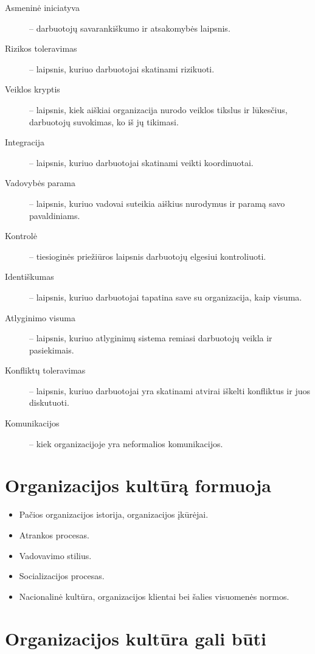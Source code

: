 \begin{description}
  \item[Asmeninė iniciatyva] – darbuotojų savarankiškumo ir atsakomybės
    laipsnis.
  \item[Rizikos toleravimas] – laipsnis, kuriuo darbuotojai skatinami
    rizikuoti.
  \item[Veiklos kryptis] – laipsnis, kiek aiškiai organizacija nurodo
    veiklos tikslus ir lūkesčius, darbuotojų suvokimas, ko iš jų tikimasi.
  \item[Integracija] – laipsnis, kuriuo darbuotojai skatinami veikti
    koordinuotai.
  \item[Vadovybės parama] – laipsnis, kuriuo vadovai suteikia aiškius
    nurodymus ir paramą savo pavaldiniams.
  \item[Kontrolė] – tiesioginės priežiūros laipsnis darbuotojų elgesiui
    kontroliuoti.
  \item[Identiškumas] – laipsnis, kuriuo darbuotojai tapatina save su
    organizacija, kaip visuma.
  \item[Atlyginimo visuma] – laipsnis, kuriuo atlyginimų sistema remiasi
    darbuotojų veikla ir pasiekimais.
  \item[Konfliktų toleravimas] – laipsnis, kuriuo darbuotojai yra skatinami
    atvirai iškelti konfliktus ir juos diskutuoti.
  \item[Komunikacijos] – kiek organizacijoje yra neformalios komunikacijos.
\end{description}

\section{Organizacijos kultūrą formuoja}

\begin{itemize}
  \item Pačios organizacijos istorija, organizacijos įkūrėjai.
  \item Atrankos procesas.
  \item Vadovavimo stilius.
  \item Socializacijos procesas.
  \item Nacionalinė kultūra, organizacijos klientai bei šalies visuomenės
    normos.
\end{itemize}

\section{Organizacijos kultūra gali būti}

